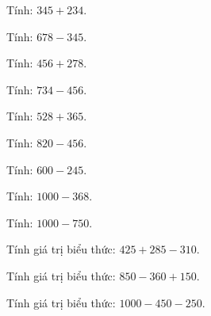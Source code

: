 \begin{ex}
Tính: $345 + 234$.
\end{ex}

\begin{ex}
Tính: $678 - 345$.
\end{ex}

\begin{ex}
Tính: $456 + 278$.
\end{ex}

\begin{ex}
Tính: $734 - 456$.
\end{ex}

\begin{ex}
Tính: $528 + 365$.
\end{ex}

\begin{ex}
Tính: $820 - 456$.
\end{ex}

\begin{ex}
Tính: $600 - 245$.
\end{ex}

\begin{ex}
Tính: $1000 - 368$.
\end{ex}

\begin{ex}
Tính: $1000 - 750$.
\end{ex}

\begin{ex}
Tính giá trị biểu thức: $425 + 285 - 310$.
\end{ex}

\begin{ex}
Tính giá trị biểu thức: $850 - 360 + 150$.
\end{ex}

\begin{ex}
Tính giá trị biểu thức: $1000 - 450 - 250$.
\end{ex}

